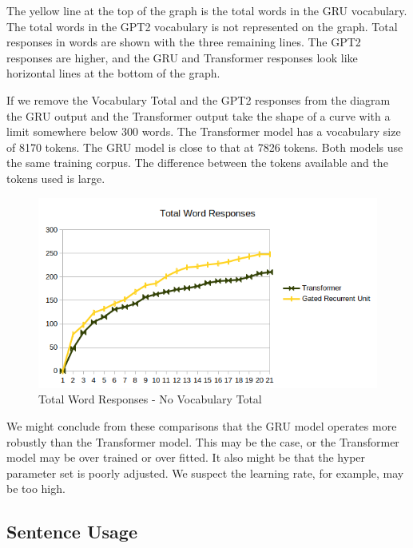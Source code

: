The yellow line at the top of the graph is the total words in the GRU vocabulary. The total words in the GPT2 vocabulary is not represented on the graph. Total responses in words are shown with the three remaining lines. The GPT2 responses are higher, and the GRU and Transformer responses look like horizontal lines at the bottom of the graph.

If we remove the Vocabulary Total and the GPT2 responses from the diagram the GRU output and the Transformer output take the shape of a curve with a limit somewhere below 300 words. The Transformer model has a vocabulary size of 8170 tokens. The GRU model is close to that at 7826 tokens. Both models use the same training corpus. The difference between the tokens available and the tokens used is large.


\begin{figure}[H]
	\begin{center}
		\includegraphics[scale=0.75]{diagram-word01}
		
		
	\end{center}
	\caption[Total Word Responses]{Total Word Responses - No Vocabulary Total}
	
	
\end{figure}

We might conclude from these comparisons that the GRU model operates more robustly than the Transformer model. This may be the case, or the Transformer model may be over trained or over fitted. It also might be that the hyper parameter set is poorly adjusted. We suspect the learning rate, for example, may be too high.

\subsection{Sentence Usage}

